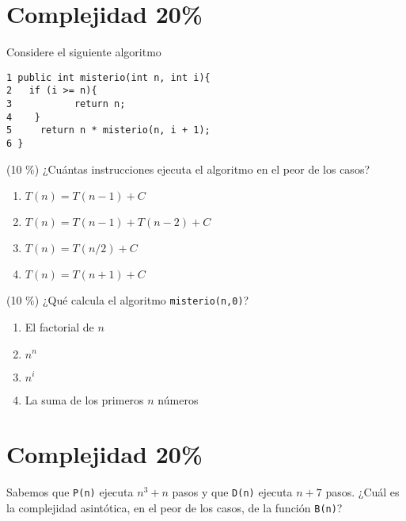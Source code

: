\documentclass[twocolumn]{article}
\begin{document}
\section{Complejidad 20\%}

Considere el siguiente algoritmo

\begin{verbatim}
1 public int misterio(int n, int i){
2   if (i >= n){
3           return n; 
4    }
5     return n * misterio(n, i + 1);
6 } 
\end{verbatim}

(10 \%) ¿Cuántas instrucciones ejecuta el algoritmo en el peor de los casos?
\begin{enumerate}[label=\Alph*.]
\item $T(n) = T(n-1) + C$
\item $T(n) = T(n-1)+T(n-2) + C$
\item $T(n) = T(n/2) + C$
\item $T(n) = T(n+1) + C$\\
\end{enumerate}

(10 \%) ¿Qué calcula el algoritmo \texttt{misterio(n,0)}?
\begin{enumerate}[label=\Alph*.]
\item El factorial de $n$
\item $n^n$
\item $n^i$
\item La suma de los primeros $n$ números
\end{enumerate}




\section{Complejidad 20\%}
Sabemos que \texttt{P(n)} ejecuta $n^3 + n$ pasos y que \texttt{D(n)} ejecuta $n + 7$ pasos. ¿Cuál es la complejidad asintótica, en el peor de los casos, de la función \texttt{B(n)}?
\end{document}

